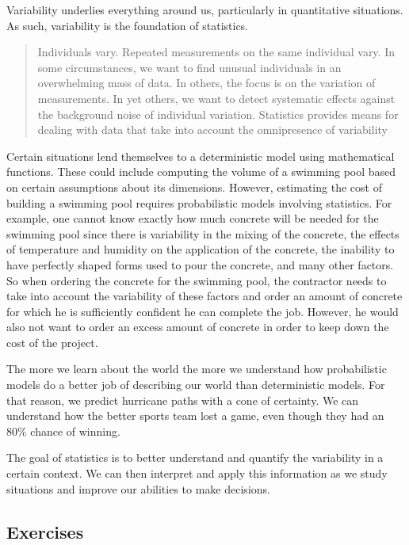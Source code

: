 \documentclass[
]{book}
\theoremstyle{definition}
\theoremstyle{definition}
\theoremstyle{definition}
\theoremstyle{definition}
\theoremstyle{remark}
\begin{document}
Variability underlies everything around us, particularly in quantitative situations. As such, variability is the foundation of statistics.

\begin{quote}
Individuals vary. Repeated measurements on the same individual vary. In some circumstances, we want to find unusual individuals in an overwhelming mass of data. In others, the focus is on the variation of measurements. In yet others, we want to detect systematic effects against the background noise of individual variation. Statistics provides means for dealing with data that take into account the omnipresence of variability \citep[p.~801]{Cobb1997}
\end{quote}

Certain situations lend themselves to a deterministic model using mathematical functions. These could include computing the volume of a swimming pool based on certain assumptions about its dimensions. However, estimating the cost of building a swimming pool requires probabilistic models involving statistics. For example, one cannot know exactly how much concrete will be needed for the swimming pool since there is variability in the mixing of the concrete, the effects of temperature and humidity on the application of the concrete, the inability to have perfectly shaped forms used to pour the concrete, and many other factors. So when ordering the concrete for the swimming pool, the contractor needs to take into account the variability of these factors and order an amount of concrete for which he is sufficiently confident he can complete the job. However, he would also not want to order an excess amount of concrete in order to keep down the cost of the project.

The more we learn about the world the more we understand how probabilistic models do a better job of describing our world than deterministic models. For that reason, we predict hurricane paths with a cone of certainty. We can understand how the better sports team lost a game, even though they had an 80\% chance of winning.

The goal of statistics is to better understand and quantify the variability in a certain context. We can then interpret and apply this information as we study situations and improve our abilities to make decisions.

\hypertarget{exercises-58}{%
\subsection{Exercises}\label{exercises-58}}
\end{document}
